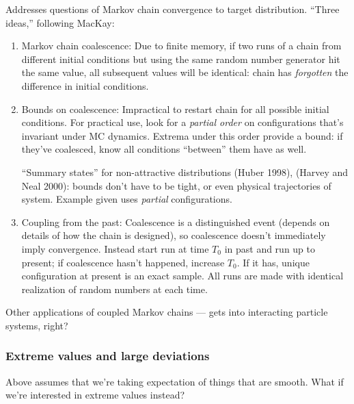 \documentclass[notitlepage,openany,11pt]{report}
\numberwithin{equation}{section}
\theoremstyle{plain}%
\begin{document}
Addresses questions of Markov chain convergence to target distribution. ``Three ideas,'' following MacKay:
\begin{enumerate}
\item Markov chain coalescence: Due to finite memory, if two runs of a chain from different initial conditions but using the same random number generator  hit the same value, all subsequent values will be identical: chain has \textit{forgotten} the difference in initial conditions.

\item Bounds on coalescence: Impractical to restart chain for all possible initial conditions. For practical use, look for a \textit{partial order} on configurations that's invariant under MC dynamics. Extrema under this order provide a bound: if they've coalesced, know all conditions ``between'' them have as well. 

``Summary states'' for non-attractive distributions (Huber 1998), (Harvey and Neal 2000): bounds don't have to be tight, or even physical trajectories of system. Example given uses \textit{partial} configurations. 

\item Coupling from the past: Coalescence is a distinguished event (depends on details of how the chain is designed), so coalescence doesn't immediately imply convergence. Instead start run at time $T_{0}$ in past and run up to present;  if coalescence hasn't happened, increase $T_{0}$. If it has, unique configuration at present is an exact sample. All runs are made with identical realization of random numbers at each time. 

\end{enumerate}

Other applications of coupled Markov chains --- gets into interacting particle systems, right?


\subsubsection{Extreme values and large deviations} Above assumes that we're taking expectation of things that are smooth. What if we're interested in extreme values instead?
\end{document}
